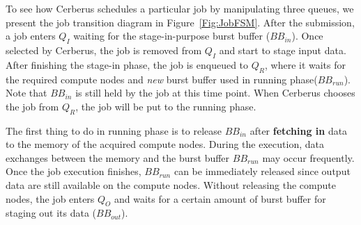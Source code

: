 
To see how Cerberus schedules a particular job by manipulating three queues,
we present the job transition diagram in Figure~\ref{Fig:JobFSM}.
After the submission, a job enters $Q_I$ waiting for the stage-in-purpose burst buffer ($BB_{in}$).
Once selected by Cerberus, the job is removed from $Q_I$ and start to stage input data.
After finishing the stage-in phase, the job is enqueued to $Q_R$,
where it waits for the required compute nodes and \textit{new} burst buffer used in running phase($BB_{run}$).
Note that $BB_{in}$ is still held by the job at this time point.
When Cerberus chooses the job from $Q_R$, the job will be put to the running phase.

The first thing to do in running phase is to release $BB_{in}$ after
\textbf{fetching in} data to the memory of the acquired compute nodes.
During the execution, data exchanges between the memory and the burst buffer $BB_{run}$
may occur frequently.
Once the job execution finishes, $BB_{run}$ can be immediately released since
output data are still available on the compute nodes.
Without releasing the compute nodes, the job enters $Q_O$ and waits for a certain amount of burst buffer for staging out its data ($BB_{out}$).

